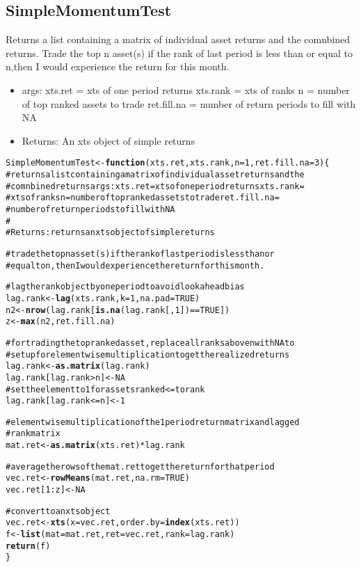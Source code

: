 \documentclass{article}\usepackage{graphicx, color}
\makeatletter
\newcommand{\hlfunctioncall}[1]{\textcolor[rgb]{0.501960784313725,0,0.329411764705882}{\textbf{#1}}}%
\newcommand{\hlcomment}[1]{\textcolor[rgb]{0.180392156862745,0.6,0.341176470588235}{#1}}%
\newenvironment{kframe}{%
 \def\at@end@of@kframe{}%
 \ifinner\ifhmode%
  \def\at@end@of@kframe{\end{minipage}}%
  \begin{minipage}{\columnwidth}%
 \fi\fi%
 \def\FrameCommand##1{\hskip\@totalleftmargin \hskip-\fboxsep
 \colorbox{shadecolor}{##1}\hskip-\fboxsep
     \hskip-\linewidth \hskip-\@totalleftmargin \hskip\columnwidth}%
 \MakeFramed {\advance\hsize-\width
   \@totalleftmargin\z@ \linewidth\hsize
   \@setminipage}}%
 {\par\unskip\endMakeFramed%
 \at@end@of@kframe}
\newenvironment{knitrout}{}{} %
\makeatother
\begin{document}
\subsection{SimpleMomentumTest}
Returns a list containing a matrix of individual asset returns and the comnbined returns. Trade the top n asset(s) if the rank of last period is less than or equal to n,then I would experience the return for this month.
\begin{itemize}
\item args:
  xts.ret = xts of one period returns
  xts.rank = xts of ranks
  n = number of top ranked assets to trade
  ret.fill.na = number of return periods to fill with NA
\item Returns:
  An xts object of simple returns
\end{itemize}
\begin{knitrout}
\color{fgcolor}\begin{kframe}
\begin{alltt}
SimpleMomentumTest <- \hlfunctioncall{function}(xts.ret, xts.rank, n = 1, ret.fill.na = 3) \{
\hlcomment{    # returns a list containing a matrix of individual asset returns and the}
\hlcomment{    # comnbined returns args: xts.ret = xts of one period returns xts.rank =}
\hlcomment{    # xts of ranks n = number of top ranked assets to trade ret.fill.na =}
\hlcomment{    # number of return periods to fill with NA}
\hlcomment{    # }
\hlcomment{    # Returns: returns an xts object of simple returns}
    
\hlcomment{    # trade the top n asset(s) if the rank of last period is less than or}
\hlcomment{    # equal to n, then I would experience the return for this month.}
    
\hlcomment{    # lag the rank object by one period to avoid look ahead bias}
    lag.rank <- \hlfunctioncall{lag}(xts.rank, k = 1, na.pad = TRUE)
    n2 <- \hlfunctioncall{nrow}(lag.rank[\hlfunctioncall{is.na}(lag.rank[, 1]) == TRUE])
    z <- \hlfunctioncall{max}(n2, ret.fill.na)
    
\hlcomment{    # for trading the top ranked asset, replace all ranks above n with NA to}
\hlcomment{    # set up for element wise multiplication to get the realized returns}
    lag.rank <- \hlfunctioncall{as.matrix}(lag.rank)
    lag.rank[lag.rank > n] <- NA
\hlcomment{    # set the element to 1 for assets ranked <= to rank}
    lag.rank[lag.rank <= n] <- 1
    
\hlcomment{    # element wise multiplication of the 1 period return matrix and lagged}
\hlcomment{    # rank matrix}
    mat.ret <- \hlfunctioncall{as.matrix}(xts.ret) * lag.rank
    
\hlcomment{    # average the rows of the mat.ret to get the return for that period}
    vec.ret <- \hlfunctioncall{rowMeans}(mat.ret, na.rm = TRUE)
    vec.ret[1:z] <- NA
    
\hlcomment{    # convert to an xts object}
    vec.ret <- \hlfunctioncall{xts}(x = vec.ret, order.by = \hlfunctioncall{index}(xts.ret))
    f <- \hlfunctioncall{list}(mat = mat.ret, ret = vec.ret, rank = lag.rank)
    \hlfunctioncall{return}(f)
\}
\end{alltt}
\end{kframe}
\end{knitrout}
\end{document}
